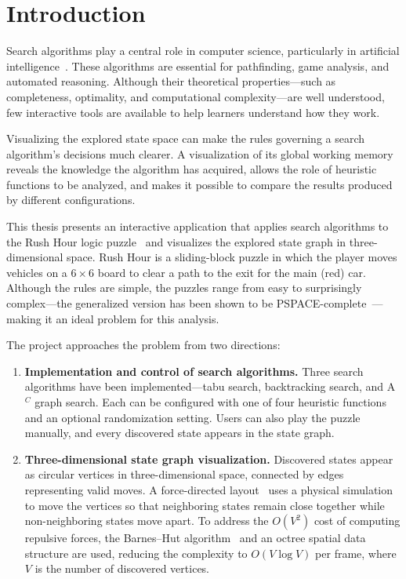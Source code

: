 \chapter{Introduction}
\label{ch:intro}

Search algorithms play a central role in computer science, particularly in artificial intelligence~\cite{russellnorvig2020}. These algorithms are essential for pathfinding, game analysis, and automated reasoning. Although their theoretical properties---such as completeness, optimality, and computational complexity---are well understood, few interactive tools are available to help learners understand how they work.

Visualizing the explored state space can make the rules governing a search algorithm's decisions much clearer. A visualization of its global working memory reveals the knowledge the algorithm has acquired, allows the role of heuristic functions to be analyzed, and makes it possible to compare the results produced by different configurations.

This thesis presents an interactive application that applies search algorithms to the Rush Hour logic puzzle~\cite{rushhour_puzzle} and visualizes the explored state graph in three-dimensional space. Rush Hour is a sliding-block puzzle in which the player moves vehicles on a $6 \times 6$ board to clear a path to the exit for the main (red) car. Although the rules are simple, the puzzles range from easy to surprisingly complex---the generalized version has been shown to be PSPACE-complete~\cite{flake2002rush}---making it an ideal problem for this analysis.

The project approaches the problem from two directions:

\begin{enumerate}
    \item \textbf{Implementation and control of search algorithms.} Three search algorithms have been implemented---tabu search, backtracking search, and A$^C$ graph search. Each can be configured with one of four heuristic functions and an optional randomization setting. Users can also play the puzzle manually, and every discovered state appears in the state graph.
    \item \textbf{Three-dimensional state graph visualization.} Discovered states appear as circular vertices in three-dimensional space, connected by edges representing valid moves. A force-directed layout~\cite{fruchterman1991graph} uses a physical simulation to move the vertices so that neighboring states remain close together while non-neighboring states move apart. To address the $O(V^2)$ cost of computing repulsive forces, the Barnes--Hut algorithm~\cite{barneshut1986} and an octree spatial data structure are used, reducing the complexity to $O(V \log V)$ per frame, where $V$ is the number of discovered vertices.
\end{enumerate}

